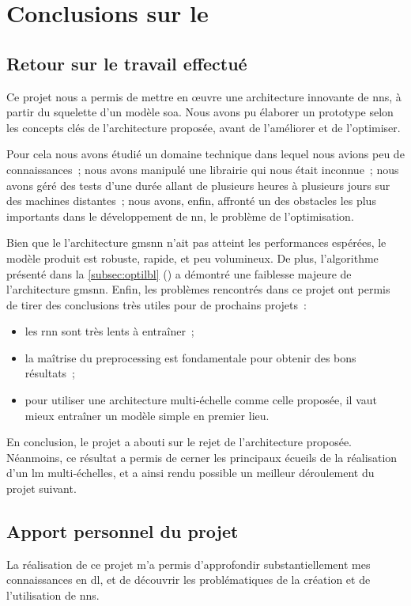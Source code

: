 \chapter{Conclusions sur le }
\section{Retour sur le travail effectué}
Ce projet nous a permis de mettre en œuvre une architecture innovante de \glspl{nn}, à partir du squelette d'un modèle \gls{soa}.
Nous avons pu élaborer un prototype selon les concepts clés de l'architecture proposée, avant de l'améliorer et de l'optimiser.

Pour cela nous avons étudié un domaine technique dans lequel nous avions peu de connaissances~; nous avons manipulé une librairie qui nous était inconnue~;
nous avons géré des tests d'une durée allant de plusieurs heures à plusieurs jours sur des machines distantes~; nous avons, enfin, affronté un des obstacles les plus importants dans le développement de \gls{nn}, le problème de l'optimisation.

Bien que le l'architecture \gls{gmsnn} n'ait pas atteint les performances espérées, le modèle produit est robuste, rapide, et peu volumineux.
De plus, l'algorithme présenté dans la \autoref{subsec:optilbl} () a démontré une faiblesse majeure de l'architecture \gls{gmsnn}.
Enfin, les problèmes rencontrés dans ce projet ont permis de tirer des conclusions très utiles pour de prochains projets~:
\begin{itemize}
	\item les \gls{rnn} sont très lents à entraîner~;
	\item la maîtrise du \gls{preprocessing} est fondamentale pour obtenir des bons résultats~;
	\item pour utiliser une architecture multi-échelle comme celle proposée, il vaut mieux entraîner un modèle simple en premier lieu.
\end{itemize}\hspace{1em}

En conclusion, le projet a abouti sur le rejet de l'architecture proposée.
Néanmoins, ce résultat a permis de cerner les principaux écueils de la réalisation d'un \gls{lm} multi-échelles, et a ainsi rendu possible un meilleur déroulement du projet suivant.


\section{Apport personnel du projet}
La réalisation de ce projet m'a permis d'approfondir substantiellement mes connaissances en \gls{dl}, et de découvrir les problématiques de la création et de l'utilisation de \glspl{nn}.

